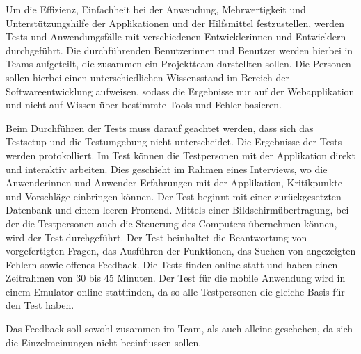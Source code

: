 Um die Effizienz, Einfachheit bei der Anwendung, Mehrwertigkeit und Unterstützungshilfe der Applikationen und der Hilfsmittel festzustellen, werden Tests und Anwendungsfälle mit verschiedenen Entwicklerinnen und Entwicklern durchgeführt. Die durchführenden Benutzerinnen und Benutzer werden hierbei in Teams aufgeteilt, die zusammen ein Projektteam darstellten sollen. Die Personen sollen hierbei einen unterschiedlichen Wissensstand im Bereich der Softwareentwicklung aufweisen, sodass die Ergebnisse nur auf der Webapplikation und nicht auf Wissen über bestimmte Tools und Fehler basieren. 

Beim Durchführen der Tests muss darauf geachtet werden, dass sich das Testsetup und die Testumgebung nicht unterscheidet. Die Ergebnisse der Tests werden protokolliert. Im Test können die Testpersonen mit der Applikation direkt und interaktiv arbeiten. Dies geschieht im Rahmen eines Interviews, wo die Anwenderinnen und Anwender Erfahrungen mit der Applikation, Kritikpunkte und Vorschläge einbringen können. Der Test beginnt mit einer zurückgesetzten Datenbank und einem leeren Frontend. Mittels einer Bildschirmübertragung, bei der die Testpersonen auch die Steuerung des Computers übernehmen können, wird der Test durchgeführt.
Der Test beinhaltet die Beantwortung von vorgefertigten Fragen, das Ausführen der Funktionen, das Suchen von angezeigten Fehlern sowie offenes Feedback. Die Tests finden online statt und haben einen Zeitrahmen von 30 bis 45 Minuten. Der Test für die mobile Anwendung wird in einem Emulator online stattfinden, da so alle Testpersonen die gleiche Basis für den Test haben.

Das Feedback soll sowohl zusammen im Team, als auch alleine geschehen, da sich die Einzelmeinungen nicht beeinflussen sollen.
